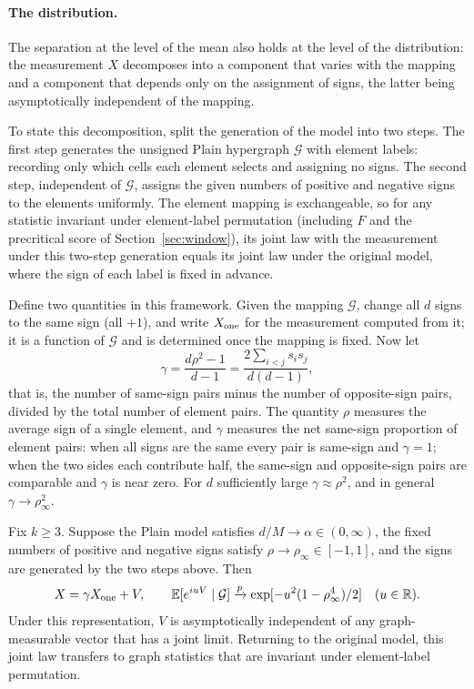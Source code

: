 \paragraph{The distribution.}
The separation at the level of the mean also holds at the level of the distribution: the measurement $X$ decomposes into a component that varies with the mapping and a component that depends only on the assignment of signs, the latter being asymptotically independent of the mapping.

To state this decomposition, split the generation of the model into two steps. The first step generates the unsigned Plain hypergraph $\mathcal G$ with element labels:
recording only which cells each element selects and assigning no signs. The second step, independent of $\mathcal G$, assigns the given numbers of positive and negative signs to the elements uniformly.
The element mapping is exchangeable, so for any statistic invariant under element-label permutation (including $F$ and
the precritical score of Section~\ref{sec:window}), its joint law with the measurement under this two-step generation
equals its joint law under the original model, where the sign of each label is fixed in advance.

Define two quantities in this framework. Given the mapping $\mathcal G$, change all $d$ signs to the same sign (all $+1$), and write $X_{\rm one}$ for the measurement computed from it; it is a function of $\mathcal G$ and is determined once the mapping is fixed. Now let
\begin{equation*}
\gamma=\frac{d\rho^2-1}{d-1}=\frac{2\sum_{i<j}s_is_j}{d(d-1)},
\end{equation*}
that is, the number of same-sign pairs minus the number of opposite-sign pairs, divided by the total number of element pairs. The quantity $\rho$ measures the average sign of a single element, and $\gamma$ measures the net same-sign proportion of element pairs: when all signs are the same every pair is same-sign and $\gamma=1$; when the two sides each contribute half, the same-sign and opposite-sign pairs are comparable and $\gamma$ is near zero. For $d$ sufficiently large $\gamma\approx\rho^2$, and in general $\gamma\to\rho_\infty^2$.

\begin{theorem}\label{thm:sign}
Fix $k\ge3$. Suppose the Plain model satisfies $d/M\to\alpha\in(0,\infty)$, the fixed numbers of positive and negative signs satisfy
$\rho\to\rho_\infty\in[-1,1]$, and the signs are generated by the two steps above. Then
\begin{equation*}
X=\gamma X_{\rm one}+V,\qquad
\mathbb E[e^{iuV}\mid\mathcal G]\xrightarrow{p}\exp[-u^2(1-\rho_\infty^4)/2]\quad(u\in\mathbb R).
\end{equation*}
Under this representation, $V$ is asymptotically independent of any graph-measurable vector that has a joint limit. Returning to the original model,
this joint law transfers to graph statistics that are invariant under element-label permutation.
\end{theorem}


